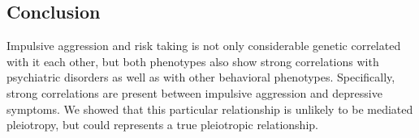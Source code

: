 \subsection*{Conclusion}
\label{sub:conclusion}

Impulsive aggression and risk taking is not only considerable genetic correlated with it each other, but both phenotypes also show strong correlations with psychiatric disorders as well as with other behavioral phenotypes.
Specifically, strong correlations are present between impulsive aggression and depressive symptoms.
We showed that this particular relationship is unlikely to be mediated pleiotropy, but could represents a true pleiotropic relationship.
